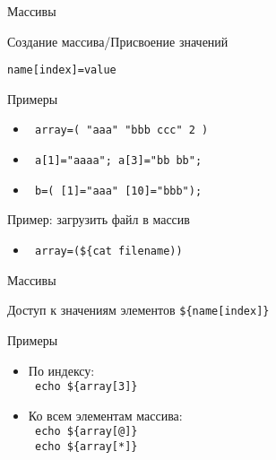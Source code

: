 \begin{frame}[fragile]{Массивы}


	\bigskip

	\begin{block}{Создание массива/Присвоение значений}

		{\tt name[index]=value}
	\end{block}
	
	\begin{block}{Примеры}
		\begin{itemize}
			\item \verb+ array=( "aaa" "bbb ccc" 2 ) +
			\item \verb+ a[1]="aaaa"; a[3]="bb bb";   +
			\item \verb+ b=( [1]="aaa" [10]="bbb"); +
		\end{itemize}
	\end{block}

	\pause

	\begin{block}{Пример: загрузить файл в массив}
		\begin{itemize}
			\item \verb+ array=(${cat filename)) +
		\end{itemize}
	\end{block}

\end{frame}

\begin{frame}[fragile]{Массивы}
	\begin{block}{Доступ к значениям элементов}
		{\tt \$\{name[index]\}}
	\end{block}
	
	\begin{block}{Примеры}
		\begin{itemize}
			\item По индексу: \\
				\verb+ echo ${array[3]} +
			\item Ко всем элементам массива: \\
				\verb+ echo ${array[@]} + \\
				\verb+ echo ${array[*]} + 
		\end{itemize}
	\end{block}
\end{frame}

